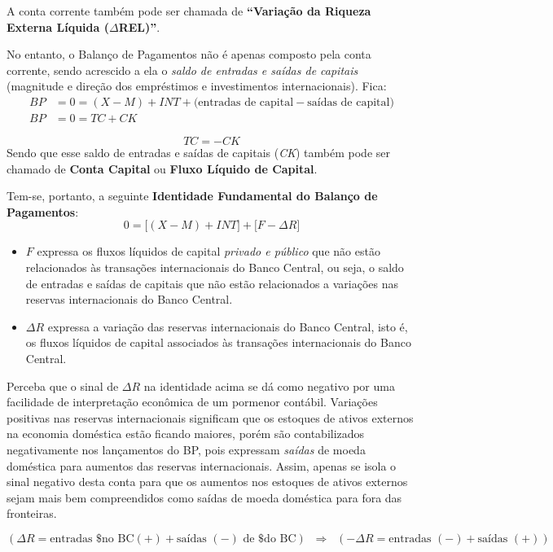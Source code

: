 \documentclass[a4paper,12pt]{article}[abntex2]
\begin{document}
A conta corrente também pode ser chamada de \textbf{“Variação da Riqueza Externa Líquida (\(\Delta\)REL)”}.

No entanto, o Balanço de Pagamentos não é apenas composto pela conta corrente, sendo acrescido a ela o \emph{saldo de entradas e saídas de capitais} (magnitude e direção dos empréstimos e investimentos internacionais). Fica:
\[
\begin{aligned}
BP &= 0=(X-M)+INT+\bigl(\text{entradas de capital}-\text{saídas de capital}\bigr)\\
BP &= 0 = TC + CK
\end{aligned}
\]

\[
TC = -CK
\]
Sendo que esse saldo de entradas e saídas de capitais (\textit{CK}) também pode ser chamado de \textbf{Conta Capital} ou \textbf{Fluxo Líquido de Capital}.

Tem-se, portanto, a seguinte \textbf{Identidade Fundamental do Balanço de Pagamentos}:
\[
0=\bigl[(X-M)+INT\bigr]+\bigl[F-\Delta R\bigr]
\]

\begin{itemize}
  \item $F$ expressa os fluxos líquidos de capital \emph{privado e público} que não estão relacionados às transações internacionais do Banco Central, ou seja, o saldo de entradas e saídas de capitais que não estão relacionados a variações nas reservas internacionais do Banco Central.
  \item $\Delta R$ expressa a variação das reservas internacionais do Banco Central, isto é, os fluxos líquidos de capital associados às transações internacionais do Banco Central.
\end{itemize}

Perceba que o sinal de $\Delta R$ na identidade acima se dá como negativo por uma facilidade de interpretação econômica de um pormenor contábil.  
Variações positivas nas reservas internacionais significam que os estoques de ativos externos na economia doméstica estão ficando maiores, porém são contabilizados negativamente nos lançamentos do BP, pois expressam \emph{saídas} de moeda doméstica para aumentos das reservas internacionais.  
Assim, apenas se isola o sinal negativo desta conta para que os aumentos nos estoques de ativos externos sejam mais bem compreendidos como saídas de moeda doméstica para fora das fronteiras.

\[
(\Delta R = \text{entradas \$ no BC}(+)+\text{saídas }(-)\text{ de \$ do BC})
\;\;\Longrightarrow\;\;
(-\Delta R = \text{entradas }(-)+\text{saídas }(+))
\]
\end{document}
